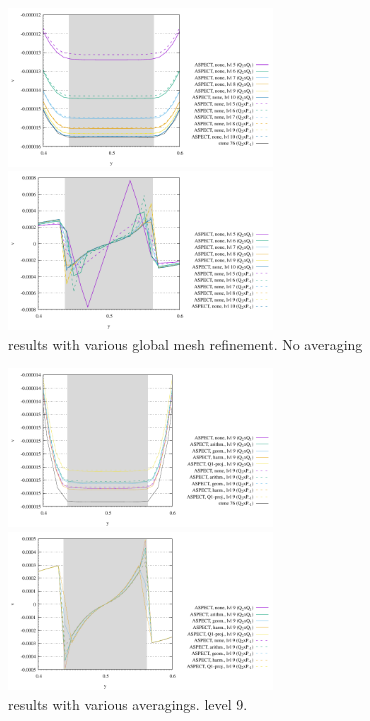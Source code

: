 \begin{center}
\includegraphics[width=7cm]{images/sinking_block/v_FS_ASPECT_56789}
\includegraphics[width=7cm]{images/sinking_block/pressure_FS_ASPECT_56789}\\
{\captionfont \aspect{} results with various global mesh refinement. No averaging}
\end{center}

\begin{center}
\includegraphics[width=7cm]{images/sinking_block/v_FS_ASPECT_avrg}
\includegraphics[width=7cm]{images/sinking_block/pressure_FS_ASPECT_avrg}\\
{\captionfont \aspect{} results with various averagings. level 9.}
\end{center}



